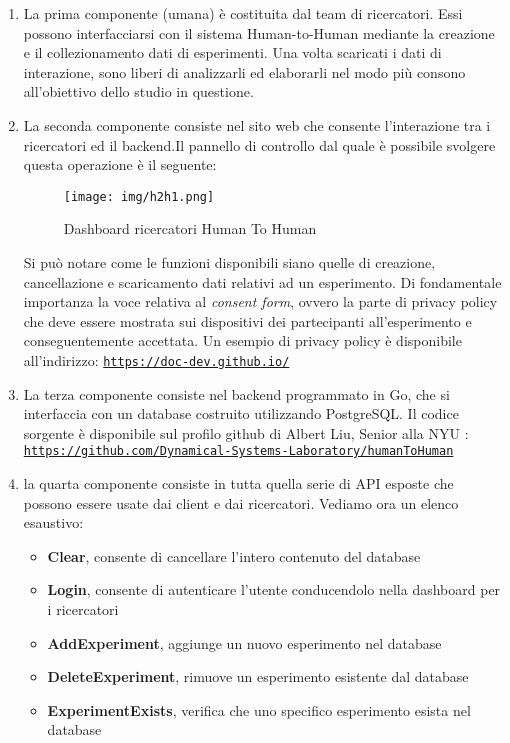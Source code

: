 \documentclass[12pt,twoside]{report}
\begin{document}
	\begin{enumerate}
	    \item La prima componente (umana) è costituita dal team di ricercatori. Essi possono interfacciarsi con il sistema Human-to-Human mediante la creazione e il collezionamento dati di esperimenti. Una volta scaricati i dati di interazione, sono liberi di analizzarli ed elaborarli nel modo più consono all'obiettivo dello studio in questione.
	    \item La seconda componente consiste nel sito web che consente l'interazione tra i ricercatori ed il backend.Il pannello di controllo dal quale è possibile svolgere questa operazione è il seguente:
	    \begin{figure}[h]
	    \centering
	    \texttt{[image: img/h2h1.png]}
	    \centering
	    \caption{Dashboard ricercatori Human To Human}
	    \label{fig:my_label}
	\end{figure}
	Si può notare come le funzioni disponibili siano quelle di creazione, cancellazione e scaricamento dati relativi ad un esperimento. Di fondamentale importanza la voce relativa al \textit{consent form}, ovvero la parte di privacy policy che deve essere mostrata sui dispositivi dei partecipanti all'esperimento e conseguentemente accettata. Un esempio di privacy policy è disponibile all'indirizzo: \texttt{\url{https://doc-dev.github.io/}} 
	\item La terza componente consiste nel backend programmato in Go, che si interfaccia con un database costruito utilizzando PostgreSQL. Il codice sorgente è disponibile sul profilo github di Albert Liu, Senior alla NYU : \texttt{\url{https://github.com/Dynamical-Systems-Laboratory/humanToHuman}}
	\item la quarta componente consiste in tutta quella serie di API esposte che possono essere usate dai client e dai ricercatori. Vediamo ora un elenco esaustivo:
	\begin{itemize}
    \item \textbf{Clear}, consente di cancellare l'intero contenuto del database
    \item \textbf{Login}, consente di autenticare l'utente conducendolo nella dashboard per i ricercatori
    \item \textbf{AddExperiment}, aggiunge un nuovo esperimento nel database
    \item \textbf{DeleteExperiment}, rimuove un esperimento esistente dal database
    \item \textbf{ExperimentExists}, verifica che uno specifico esperimento esista nel database

\end{itemize}
\end{enumerate}
\end{document}
